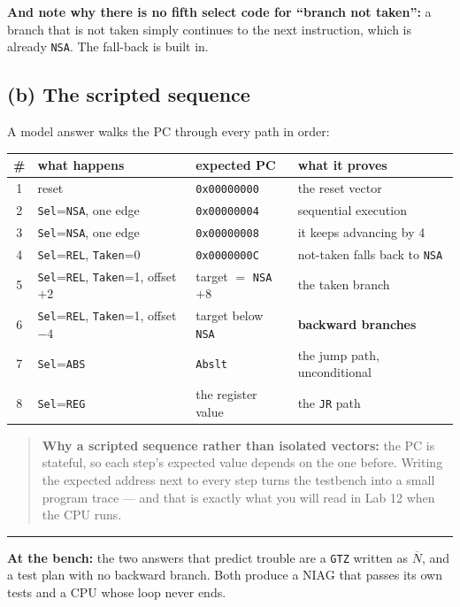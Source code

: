 \documentclass[11pt]{article}
\newcommand{\code}[1]{\texttt{#1}}
\newcommand{\hr}{\vspace{2pt}\hrule\vspace{6pt}}
\begin{document}
\textbf{And note why there is no fifth select code for ``branch not taken'':} a
branch that is not taken simply continues to the next instruction, which is
already \code{NSA}. The fall-back is built in.

\subsection*{(b) The scripted sequence}

A model answer walks the PC through every path in order:

\begin{center}
\small
\begin{tabular}{c>{\raggedright\arraybackslash}p{5.6cm}ll}
\toprule
\# & what happens & expected PC & what it proves \\
\midrule
1 & reset & \code{0x00000000} & the reset vector \\
2 & \code{Sel}=\code{NSA}, one edge & \code{0x00000004} & sequential execution \\
3 & \code{Sel}=\code{NSA}, one edge & \code{0x00000008} & it keeps advancing by 4 \\
4 & \code{Sel}=\code{REL}, \code{Taken}=0 & \code{0x0000000C} & not-taken falls back to \code{NSA} \\
5 & \code{Sel}=\code{REL}, \code{Taken}=1, offset $+2$ & target $=$ \code{NSA}$+8$ & the taken branch \\
6 & \code{Sel}=\code{REL}, \code{Taken}=1, offset $-4$ & target below \code{NSA} & \textbf{backward branches} \\
7 & \code{Sel}=\code{ABS} & \code{Abslt} & the jump path, unconditional \\
8 & \code{Sel}=\code{REG} & the register value & the \code{JR} path \\
\bottomrule
\end{tabular}
\end{center}

\begin{quote}
\textbf{Why a scripted sequence rather than isolated vectors:} the PC is stateful,
so each step's expected value depends on the one before. Writing the expected
address next to every step turns the testbench into a small program trace --- and
that is exactly what you will read in Lab 12 when the CPU runs.
\end{quote}

\vspace{6pt}
\hr
{\small \textbf{At the bench:} the two answers that predict trouble are a
\code{GTZ} written as $\overline{N}$, and a test plan with no backward branch.
Both produce a NIAG that passes its own tests and a CPU whose loop never ends.}
\end{document}
